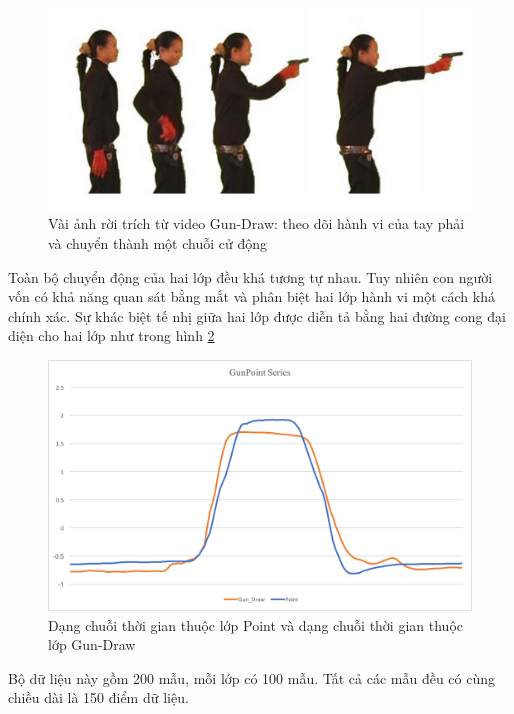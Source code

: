 \documentclass[13pt,oneside]{scrbook}
\begin{document}
\begin{figure}[!h]
	\begin{center}
		\includegraphics[width=130mm]{GunPoint.png}
		\caption{Vài ảnh rời trích từ video Gun-Draw: theo dõi hành vi của tay phải và chuyển thành một chuỗi cử động} 
		\label{GunPoint.png}
	\end{center}
\end{figure}
Toàn bộ chuyển động của hai lớp đều khá tương tự nhau. Tuy nhiên con người vốn có khả năng quan sát bằng mắt và phân biệt hai lớp hành vi một cách khá chính xác. Sự khác biệt tế nhị giữa hai lớp được diễn tả bằng hai đường cong đại diện cho hai lớp như trong hình \ref{Gun_Point_Graph.png}
\begin{figure}[!h]
	\begin{center}
		\includegraphics[width=130mm]{Gun_Point_Graph.png}
		\caption{Dạng chuỗi thời gian thuộc lớp Point và dạng chuỗi thời gian thuộc lớp Gun-Draw} 
		\label{Gun_Point_Graph.png}
	\end{center}
\end{figure}

Bộ dữ liệu này gồm 200 mẫu, mỗi lớp có 100 mẫu.
Tất cả các mẫu đều có cùng chiều dài là 150 điểm dữ liệu.
\end{document}
